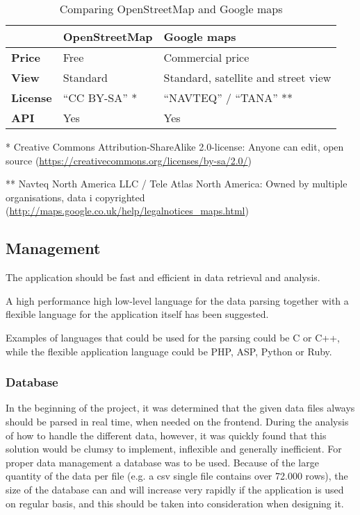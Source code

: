 \begin{table}[htbp]
\centering
\begin{tabular}{| l | l | l |}
\hline
& \textbf{OpenStreetMap} & \textbf{Google maps} \\
\hline
\textbf{Price} & Free & Commercial price \\
\hline
\textbf{View} & Standard & Standard, satellite and street view \\
\hline
\textbf{License} & ``CC BY-SA'' * & ``NAVTEQ'' / ``TANA'' ** \\
\hline
\textbf{API} & Yes & Yes \\
\hline
\end{tabular}
\caption{Comparing OpenStreetMap and Google maps}
\label{tab:osm_vs_google}
\end{table}
* Creative Commons Attribution-ShareAlike 2.0-license: Anyone can edit, open source (\url{https://creativecommons.org/licenses/by-sa/2.0/})

** Navteq North America LLC / Tele Atlas North America: Owned by multiple organisations, data i copyrighted (\url{http://maps.google.co.uk/help/legalnotices_maps.html})

\subsection{Management}
\label{sec:management}
The application should be fast and efficient in data retrieval and analysis.

A high performance high low-level language for the data parsing together with a flexible language for the application itself has been suggested.

Examples of languages that could be used for the parsing could be C or C++, while the flexible application language could be PHP, ASP, Python or Ruby.

\subsubsection{Database}
\label{sec:analysis_database}
In the beginning of the project, it was determined that the given data files always should be parsed in real time, when needed on the frontend. During the analysis of how to handle the different data, however, it was quickly found that this solution would be clumsy to implement, inflexible and generally inefficient.
For proper data management a database was to be used. Because of the large quantity of the data per file (e.g. a csv single file contains over 72.000 rows), the size of the database can and will increase very rapidly if the application is used on regular basis, and this should be taken into consideration when designing it.

